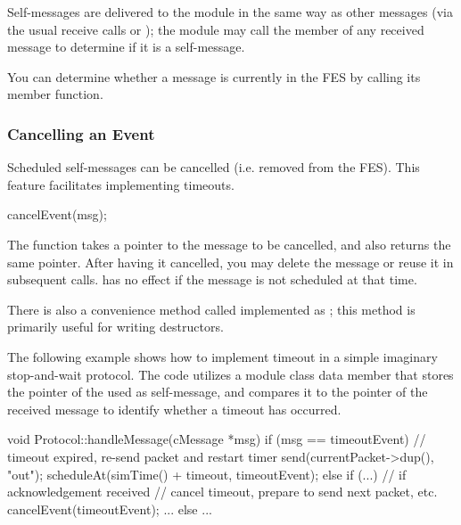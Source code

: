Self-messages are delivered to the module in the same way as other
messages (via the usual receive calls or );
the module may call the  member of any received
message to determine if it is a self-message.

You can determine whether a message is currently in the FES
by calling its  member function.

\subsubsection{Cancelling an Event}

Scheduled self-messages can be cancelled
 (i.e. removed from the FES).
This feature facilitates implementing timeouts.

\begin{cpp}
cancelEvent(msg);
\end{cpp}

The  function takes a pointer to the message to
be cancelled, and also returns the same pointer. After having it
cancelled, you may delete the message or reuse it in subsequent
 calls.  has no effect if
the message is not scheduled at that time.

There is also a convenience method called 
implemented as ;
this method is primarily useful for writing destructors.

The following example shows how to implement timeout in a simple
imaginary stop-and-wait protocol. The code utilizes a 
module class data member that stores the pointer of the  used
as self-message, and compares it to the pointer of the received message
to identify whether a timeout has occurred.

\begin{cpp}
void Protocol::handleMessage(cMessage *msg)
{
    if (msg == timeoutEvent) {
        // timeout expired, re-send packet and restart timer
        send(currentPacket->dup(), "out");
        scheduleAt(simTime() + timeout, timeoutEvent);
    }
    else if (...) {  // if acknowledgement received
        // cancel timeout, prepare to send next packet, etc.
        cancelEvent(timeoutEvent);
        ...
    }
    else {
       ...
    }
}
\end{cpp}


